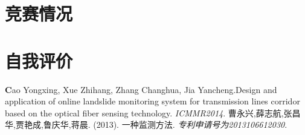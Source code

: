 \documentclass[11pt,a4paper]{moderncv}
\begin{document}
\smallskip
{}

\section{竞赛情况}

\section{自我评价}



\begin{thebibliography}{99}
\textbf Cao Yongxing, Xue Zhihang, Zhang Changhua, Jia Yancheng.Design and application of online landslide monitoring system for transmission lines corridor based on the optical fiber sensing technology. \textit{ICMMR2014}.
\textbf{}曹永兴,薛志航,张昌华,贾艳成,鲁庆华,蒋晨. (2013). 一种监测方法. \textit{专利申请号为2013106612030}.
\end{thebibliography}
\end{document}

